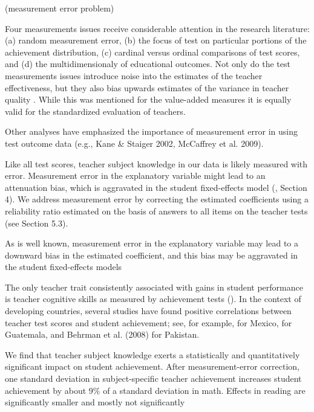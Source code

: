  (measurement error problem)


Four measurements issues receive considerable attention in the research literature: (a) random measurement error, (b) the focus of test on particular portions of the achievement distribution, (c) cardinal versus ordinal comparisons of test scores, and (d) the multidimensionaly of educational outcomes. Not only do the test measurements issues introduce noise into the estimates of the teacher effectiveness, but they also bias upwards estimates of the variance in teacher quality \citep{Hanushek_et_al_2012}. While this was mentioned for the value-added measures it is equally valid for the standardized evaluation of teachers.


Other analyses have emphasized the importance of measurement error in using test outcome data (e.g., Kane & Staiger 2002, McCaffrey et al. 2009).


Like all test scores, teacher subject knowledge in our data is likely measured with error. Measurement error in the explanatory variable might lead to an attenuation bias, which is aggravated in the student fixed-effects model (\citep{Angrist_et_al_1999}, Section 4). We address measurement error by correcting the estimated coefficients using a reliability ratio estimated on the basis of answers to all items on the teacher tests (see Section 5.3).


As is well known, measurement error in the explanatory variable may lead to a downward bias in the estimated coefficient, and this bias may be aggravated in the student fixed-effects models \citep{Angrist_et_al_1999}


The only teacher trait consistently associated with gains in student performance is teacher cognitive skills as measured by achievement tests (\citep{Hanushek_et_al_2006; Rockoff_et_al_2011}). In the context of developing countries, several studies have found positive correlations between teacher test scores and student achievement; see, for example, \citep{Santibanez_2006} for Mexico, \citep{Marshall_2009} for Guatemala, and Behrman et al. (2008) for Pakistan.


We find that teacher subject knowledge exerts a statistically and quantitatively significant impact on student achievement. After measurement-error correction, one standard deviation in subject-specific teacher achievement increases student achievement by about 9\% of a standard deviation in math. Effects in reading are significantly smaller and mostly not significantly \citep{Metzler_et_al_2012}


